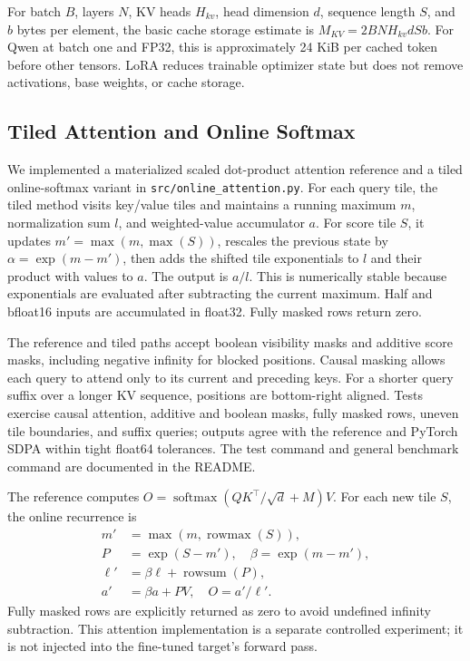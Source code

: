 \documentclass[conference]{IEEEtran}
\begin{document}
For batch $B$, layers $N$, KV heads $H_{kv}$, head dimension $d$, sequence length $S$, and $b$ bytes per element, the basic cache storage estimate is $M_{KV}=2BNH_{kv}dSb$. For Qwen at batch one and FP32, this is approximately 24 KiB per cached token before other tensors. LoRA reduces trainable optimizer state but does not remove activations, base weights, or cache storage.
\subsection{Tiled Attention and Online Softmax}


We implemented a materialized scaled dot-product attention reference and a tiled online-softmax variant in \texttt{src/online\_attention.py}. For each query tile, the tiled method visits key/value tiles and maintains a running maximum $m$, normalization sum $l$, and weighted-value accumulator $a$. For score tile $S$, it updates $m'=\max(m,\max(S))$, rescales the previous state by $\alpha=\exp(m-m')$, then adds the shifted tile exponentials to $l$ and their product with values to $a$. The output is $a/l$. This is numerically stable because exponentials are evaluated after subtracting the current maximum. Half and bfloat16 inputs are accumulated in float32. Fully masked rows return zero.

The reference and tiled paths accept boolean visibility masks and additive score masks, including negative infinity for blocked positions. Causal masking allows each query to attend only to its current and preceding keys. For a shorter query suffix over a longer KV sequence, positions are bottom-right aligned. Tests exercise causal attention, additive and boolean masks, fully masked rows, uneven tile boundaries, and suffix queries; outputs agree with the reference and PyTorch SDPA within tight float64 tolerances. The test command and general benchmark command are documented in the README.


The reference computes $O=\operatorname{softmax}(QK^\top/\sqrt{d}+M)V$. For each new tile $S$, the online recurrence is
\begin{align}
m'&=\max(m,\operatorname{rowmax}(S)),\\
P&=\exp(S-m'),\quad \beta=\exp(m-m'),\\
\ell'&=\beta\ell+\operatorname{rowsum}(P),\\
a'&=\beta a+PV,\quad O=a'/\ell'.
\end{align}
Fully masked rows are explicitly returned as zero to avoid undefined infinity subtraction. This attention implementation is a separate controlled experiment; it is not injected into the fine-tuned target's forward pass.
\end{document}
